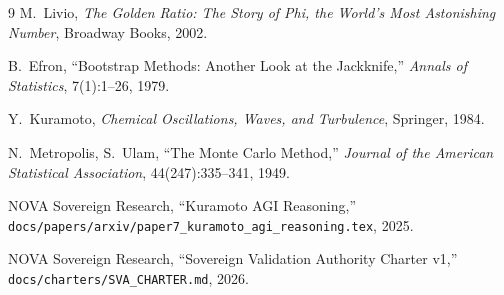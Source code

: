\documentclass[11pt,a4paper]{article}
\begin{document}
\begin{thebibliography}{9}
  M.\ Livio,
  \emph{The Golden Ratio: The Story of Phi, the World's Most Astonishing Number},
  Broadway Books, 2002.

  B.\ Efron,
  ``Bootstrap Methods: Another Look at the Jackknife,''
  \emph{Annals of Statistics}, 7(1):1--26, 1979.

  Y.\ Kuramoto,
  \emph{Chemical Oscillations, Waves, and Turbulence},
  Springer, 1984.

  N.\ Metropolis, S.\ Ulam,
  ``The Monte Carlo Method,''
  \emph{Journal of the American Statistical Association}, 44(247):335--341, 1949.

  NOVA Sovereign Research,
  ``Kuramoto AGI Reasoning,''
  \texttt{docs/papers/arxiv/paper7\_kuramoto\_agi\_reasoning.tex}, 2025.

  NOVA Sovereign Research,
  ``Sovereign Validation Authority Charter v1,''
  \texttt{docs/charters/SVA\_CHARTER.md}, 2026.
\end{thebibliography}
\end{document}
